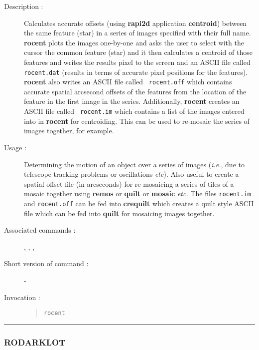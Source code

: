 \begin{description}

\item[Description :] Calculates accurate offsets (using {\bf rapi2d}
application {\bf centroid}) between the same feature (star) in a series
of images specified with their full name.  {\bf rocent} plots the
images one-by-one and asks the user to select with the cursor the
common feature (star) and it then calculates a centroid of those
features and writes the results pixel to the screen and an ASCII file
called {\tt rocent.dat} (results in terms of accurate pixel positions
for the features). {\bf rocent} also writes an ASCII file called {\tt
rocent.off} which contains accurate spatial arcsecond offsets of the
features from the location of the feature in the first image in the
series.  Additionally, {\bf rocent} creates an ASCII file called {\tt
rocent.im} which contains a list of the images entered into in {\bf
rocent} for centroiding.  This can be used to re-mosaic the series of
images together, for example.

\item[Usage :] Determining the motion of an object
over a series of images (\emph{i.e.}, due to telescope tracking
problems or oscillations \emph{etc}).  Also useful to create a spatial
offset file (in arcseconds) for re-mosaicing a series of tiles of a
mosaic together using {\bf remos} or {\bf quilt} or {\bf mosaic}
\emph{etc.}  The files {\tt rocent.im} and {\tt rocent.off} can be fed
into {\bf crequilt} which creates a quilt style ASCII file which can be
fed into {\bf quilt} for mosaicing images together.

\item[Associated commands :] {\tt {}},
{\tt {}}, {\tt {}},
{\tt {}}

\item[Short version of command :] -
\item[Invocation :]

\begin{quote}{\tt  rocent }\end{quote}

\end{description}

\hrule
\subsubsection*{\label{RODARKLOT}RODARKLOT}

